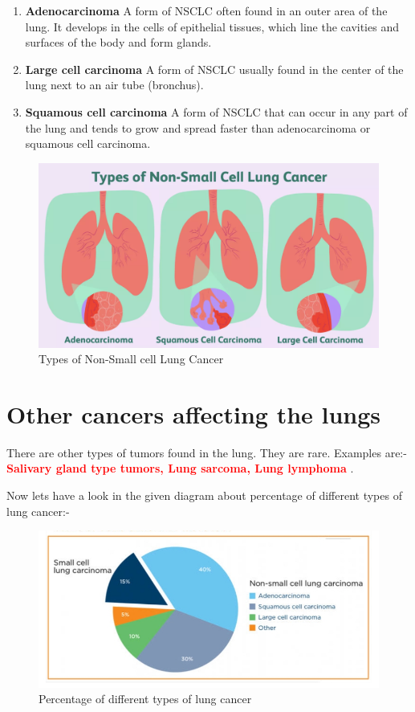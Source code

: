 \begin{enumerate}
    \item \textbf{Adenocarcinoma} A form of NSCLC often found in an outer area of the lung. It develops in the cells of epithelial tissues, which line the cavities and surfaces of the body and form glands.

    \item \textbf{Large cell carcinoma} A form of NSCLC usually found in the center of the lung next to an air tube (bronchus).

    \item \textbf{Squamous cell carcinoma} A form of NSCLC that can occur in any part of the lung and tends to grow and spread faster than adenocarcinoma or squamous cell carcinoma.
\end{enumerate}



\begin{figure}[ht!]
    \centering
    \includegraphics[width=\linewidth]{images/Non_small_cell_lung_cancer.png}
    \caption{Types of Non-Small cell Lung Cancer}
\end{figure}

\section{Other cancers affecting the lungs} 
There are other types of tumors found in the lung. They are rare. Examples are:- \textcolor{red}{\textbf{Salivary gland type tumors, Lung sarcoma, Lung lymphoma }}.
  
\vspace{3.22 mm}
Now lets have a look in the given diagram about percentage of different types of lung cancer:-

\begin{figure}[h!]
    \centering
    \includegraphics[width= 0.675\linewidth]{images/percentage_of_lc.jpeg}
    \caption{Percentage of different types of lung cancer}
    \label{fig:types-label}
\end{figure}
